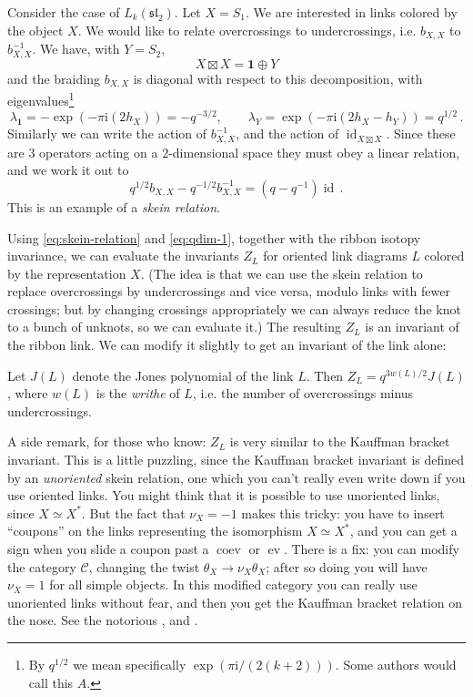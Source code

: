 \documentclass[12pt,letterpaper,reqno]{amsart}
\numberwithin{equation}{section}
\newcommand{\fsl}{{\mathfrak {sl}}}
\newcommand{\cC}{\ensuremath{\mathcal C}}
\newcommand{\I}{{\mathrm i}}
\newcommand\bid{{\mathbf 1}}
\newcommand{\ti}[1]{\textit{#1}}
\DeclareMathOperator{\id}{id}
\DeclareMathOperator{\ev}{ev}
\DeclareMathOperator{\coev}{coev}
\DeclareRobustCommand{\fixme}[1]{\leavevmode{\color{orange}[#1]}}
\begin{document}
Consider the case of $L_k(\fsl_2)$.
Let $X = S_1$. We are interested in links colored by the object $X$.
We would like to relate overcrossings to undercrossings,
i.e. $b_{X,X}$ to $b^{-1}_{X,X}$.
We have, with $Y = S_2$,
\begin{equation}
  X \boxtimes X = \bid \oplus Y
\end{equation}
and the braiding $b_{X,X}$ is diagonal with respect to this
decomposition, with eigenvalues\footnote{By $q^{1/2}$ we mean specifically $\exp(\pi \I / (2(k + 2)))$. Some authors would call this $A$.}
\begin{equation}
 \lambda_\bid = -\exp(-\pi \I (2 h_X)) = -q^{-3/2}, \qquad  \lambda_Y = \exp(-\pi \I(2 h_X - h_Y)) = q^{1/2} \, .
\end{equation}
Similarly we can write the action of $b^{-1}_{X,X}$, and the action of $\id_{X \boxtimes X}$.
Since these are $3$ operators acting on a $2$-dimensional space they must obey a linear relation,
and we work it out to
\begin{equation} \label{eq:skein-relation}
  q^{1/2} b_{X,X} - q^{-1/2} b^{-1}_{X,X} = (q - q^{-1}) \id \, .
\end{equation}
This is an example of a \ti{skein relation}. \fixme{fig}

Using \eqref{eq:skein-relation} and \eqref{eq:qdim-1}, together with the ribbon isotopy invariance,
we can evaluate the invariants $Z_L$ for oriented link diagrams $L$ colored by the representation $X$.
(The idea is that we can use the skein relation to replace overcrossings by undercrossings and
vice versa, modulo links with fewer crossings; but by changing crossings appropriately we can always reduce
the knot to a bunch of unknots, so we can evaluate it.)
The resulting $Z_L$ is an invariant of the ribbon link. We can modify it slightly to get an invariant of 
the link alone:
\begin{prop}[$L_k(\fsl_2)$ invariants vs Jones polynomials]
Let $J(L)$ denote the Jones polynomial of the link $L$. Then
$Z_L = q^{3w(L)/2} J(L)$, where $w(L)$ is the \ti{writhe} of $L$, i.e.
the number of overcrossings minus undercrossings.
\end{prop}

A side remark, for those who know: $Z_L$ is very similar to the Kauffman bracket invariant. This is a little 
puzzling, since the Kauffman bracket invariant is defined by an \ti{unoriented} skein relation,
one which you can't really even write down if you use oriented links.
You might think that it is possible to use unoriented links, since $X \simeq X^*$. But the
fact that $\nu_X = -1$ makes this tricky: you have to insert ``coupons'' on the links representing the
isomorphism $X \simeq X^*$, and you can get a sign when you slide a coupon past a $\coev$ or $\ev$.
There is a fix: you can modify the category $\cC$, changing the twist $\theta_X \to \nu_X \theta_X$; 
after so doing you will have $\nu_X = 1$ for all simple objects. In this modified category you can really
use unoriented links without fear, and then you get the Kauffman bracket relation on the nose.
See the notorious \cite{Tingley2017MinusSign}, and \cite{SnyderTingley2009HalfTwist}.
\end{document}

